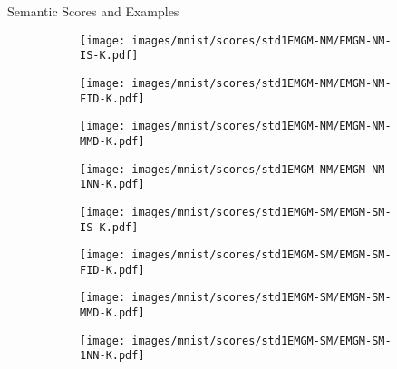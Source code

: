 \begin{frame}{Semantic Scores and Examples}
  \graphicspath{{../source/chapter6/}}
  \begin{figure}
    \captionsetup[subfigure]{justification=centering}
    \centering
    \begin{subfigure}{.24\textwidth}
      \centering
      \texttt{[image: images/mnist/scores/std1EMGM-NM/EMGM-NM-IS-K.pdf]}
    \end{subfigure}
    \vspace{-2pt}
    \begin{subfigure}{.24\textwidth}
      \centering
      \texttt{[image: images/mnist/scores/std1EMGM-NM/EMGM-NM-FID-K.pdf]}
    \end{subfigure}
    \centering
    \begin{subfigure}{.24\textwidth}
      \centering
      \texttt{[image: images/mnist/scores/std1EMGM-NM/EMGM-NM-MMD-K.pdf]}
    \end{subfigure}
    \centering
    \begin{subfigure}{0.24\textwidth}
      \centering
      \texttt{[image: images/mnist/scores/std1EMGM-NM/EMGM-NM-1NN-K.pdf]}
    \end{subfigure}
    \centering
    \begin{subfigure}{.24\textwidth}
      \centering
      \texttt{[image: images/mnist/scores/std1EMGM-SM/EMGM-SM-IS-K.pdf]}
    \end{subfigure}
    \centering
    \begin{subfigure}{.24\textwidth}
      \centering
      \texttt{[image: images/mnist/scores/std1EMGM-SM/EMGM-SM-FID-K.pdf]}
    \end{subfigure}
    \centering
    \begin{subfigure}{.24\textwidth}
      \centering
      \texttt{[image: images/mnist/scores/std1EMGM-SM/EMGM-SM-MMD-K.pdf]}
    \end{subfigure}
    \begin{subfigure}{0.24\textwidth}
      \centering
      \texttt{[image: images/mnist/scores/std1EMGM-SM/EMGM-SM-1NN-K.pdf]}

\end{subfigure}
\end{figure}
\end{frame}
